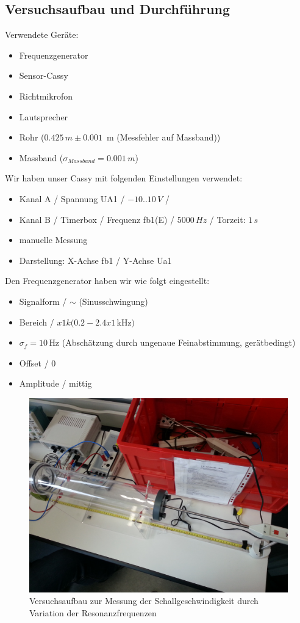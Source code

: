 \documentclass[12pt,a4paper]{article}
\begin{document}
\subsection{Versuchsaufbau und Durchführung}
Verwendete Geräte:
\begin{itemize}
\item Frequenzgenerator
\item Sensor-Cassy
\item Richtmikrofon
\item Lautsprecher
\item Rohr ($0.425\, m \pm 0.001\,$ m (Messfehler auf Massband))
\item Massband ($\sigma_{Massband} = 0.001\, m$)
\end{itemize}
Wir haben unser Cassy mit folgenden Einstellungen verwendet:
\begin{itemize}
\item Kanal A / Spannung UA1 / $-10..10\, V$ /
\item Kanal B / Timerbox / Frequenz fb1(E) / $5000\, Hz$ / Torzeit: $1\, s$
\item manuelle Messung
\item Darstellung: X-Achse fb1 / Y-Achse Ua1
\end{itemize}
Den Frequenzgenerator haben wir wie folgt eingestellt:
\begin{itemize}
\item Signalform / $\sim$ (Sinusschwingung)
\item Bereich / $x1k (0.2 - 2.4 x 1\, $kHz$)$
\item $\sigma_f = 10\,$Hz (Abschätzung durch ungenaue Feinabstimmung, gerätbedingt)
\item Offset / 0
\item Amplitude / mittig
\end{itemize}
\begin{figure}[H]
\centering
\includegraphics[scale=0.15]{Bilder/Frequenzvariation3.jpg}
\caption{Versuchsaufbau zur Messung der Schallgeschwindigkeit durch Variation der Resonanzfrequenzen}
\end{figure}
\end{document}
